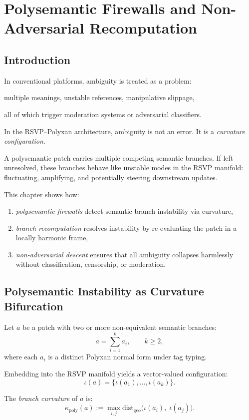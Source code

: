 \chapter{Polysemantic Firewalls and Non-Adversarial Recomputation}
\label{ch:polysemantic-firewalls}

\section{Introduction}

In conventional platforms, ambiguity is treated as a problem:
\begin{center}
multiple meanings, unstable references, manipulative slippage,
\end{center}
all of which trigger moderation systems or adversarial classifiers.

In the RSVP--Polyxan architecture, ambiguity is not an error.
It is a \emph{curvature configuration}.

A polysemantic patch carries multiple competing semantic branches.
If left unresolved, these branches behave like unstable modes in the RSVP manifold:
fluctuating, amplifying, and potentially steering downstream updates.

This chapter shows how:
\begin{enumerate}
    \item \emph{polysemantic firewalls} detect semantic branch instability via curvature,
    \item \emph{branch recomputation} resolves instability by re-evaluating the patch in a locally harmonic frame,
    \item \emph{non-adversarial descent} ensures that all ambiguity collapses harmlessly without classification, censorship, or moderation.
\end{enumerate}

\section{Polysemantic Instability as Curvature Bifurcation}

Let $a$ be a patch with two or more non-equivalent semantic branches:
\[
a = \sum_{i=1}^k a_i,
\qquad k \ge 2,
\]
where each $a_i$ is a distinct Polyxan normal form under tag typing.

Embedding into the RSVP manifold yields a vector-valued configuration:
\[
\iota(a) = \{\iota(a_1), \ldots, \iota(a_k)\}.
\]

\begin{definition}
The \emph{branch curvature} of $a$ is:
\[
\kappa_{\mathrm{poly}}(a)
:= 
\max_{i,j}
\mathrm{dist}_{\mathrm{geo}}
\bigl(
\iota(a_i),\;
\iota(a_j)
\bigr).
\]
\end{definition}

